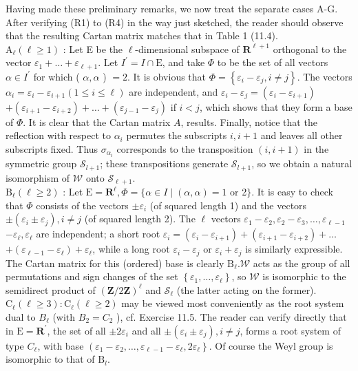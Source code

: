 \documentclass[10pt]{article}
\begin{document}
Having made these preliminary remarks, we now treat the separate cases A-G. After verifying (R1) to (R4) in the way just sketched, the reader should observe that the resulting Cartan matrix matches that in Table 1 (11.4).\\
$\mathrm{A}_{\ell}(\ell \geq 1)$ : Let E be the $\ell$-dimensional subspace of $\mathbf{R}^{\ell+1}$ orthogonal to the vector $\varepsilon_{1}+\ldots+\varepsilon_{\ell+1}$. Let $I^{\prime}=I \cap \mathrm{E}$, and take $\Phi$ to be the set of all vectors $\alpha \in I^{\prime}$ for which ( $\alpha, \alpha$ ) $=2$. It is obvious that $\Phi=\left\{\varepsilon_{i}-\varepsilon_{j}, i \neq j\right\}$. The vectors $\alpha_{i}=\varepsilon_{i}-\varepsilon_{i+1}(1 \leq i \leq \ell)$ are independent, and $\varepsilon_{i}-\varepsilon_{j}=\left(\varepsilon_{i}-\varepsilon_{i+1}\right)$ $+\left(\varepsilon_{i+1}-\varepsilon_{i+2}\right)+\ldots+\left(\varepsilon_{j-1}-\varepsilon_{j}\right)$ if $i<j$, which shows that they form a base of $\Phi$. It is clear that the Cartan matrix $A$, results. Finally, notice that the reflection with respect to $\alpha_{i}$ permutes the subscripts $i, i+1$ and leaves all other subscripts fixed. Thus $\sigma_{\alpha_{i}}$ corresponds to the transposition $(i, i+1)$ in the symmetric group $\mathscr{S}_{l+1}$; these transpositions generate $\mathscr{S}_{l+1}$, so we obtain a natural isomorphism of $\mathscr{W}$ onto $\mathscr{S}_{\ell+1}$.\\
$\mathrm{B}_{\ell}(\ell \geq 2)$ : Let $\mathrm{E}=\mathbf{R}^{\ell}, \Phi=\{\alpha \in I \mid(\alpha, \alpha)=1$ or 2$\}$. It is easy to check that $\Phi$ consists of the vectors $\pm \varepsilon_{i}$ (of squared length 1) and the vectors $\pm\left(\varepsilon_{i} \pm \varepsilon_{j}\right), i \neq j$ (of squared length 2). The $\ell$ vectors $\varepsilon_{1}-\varepsilon_{2}, \varepsilon_{2}-\varepsilon_{3}, \ldots, \varepsilon_{\ell-1}$ $-\varepsilon_{\ell}, \varepsilon_{\ell}$ are independent; a short root $\varepsilon_{i}=\left(\varepsilon_{i}-\varepsilon_{i+1}\right)+\left(\varepsilon_{i+1}-\varepsilon_{i+2}\right)+\ldots$ $+\left(\varepsilon_{\ell-1}-\varepsilon_{\ell}\right)+\varepsilon_{\ell}$, while a long root $\varepsilon_{i}-\varepsilon_{j}$ or $\varepsilon_{i}+\varepsilon_{j}$ is similarly expressible. The Cartan matrix for this (ordered) base is clearly $\mathrm{B}_{\ell} . \mathscr{W}$ acts as the group of all permutations and sign changes of the set $\left\{\varepsilon_{1}, \ldots, \varepsilon_{\ell}\right\}$, so $\mathscr{W}$ is isomorphic to the semidirect product of $(\mathbf{Z} / 2 \mathbf{Z})^{\ell}$ and $\mathscr{S}_{\ell}$ (the latter acting on the former).\\
$\mathrm{C}_{\ell}(\ell \geq 3): \mathrm{C}_{\ell}(\ell \geq 2)$ may be viewed most conveniently as the root system dual to $B_{\ell}$ (with $B_{2}=C_{2}$ ), cf. Exercise 11.5. The reader can verify directly that in $\mathrm{E}=\mathbf{R}^{\prime}$, the set of all $\pm 2 \varepsilon_{i}$ and all $\pm\left(\varepsilon_{i} \pm \varepsilon_{j}\right), i \neq j$, forms a root system of type $C_{\ell}$, with base $\left(\varepsilon_{1}-\varepsilon_{2}, \ldots, \varepsilon_{\ell-1}-\varepsilon_{\ell}, 2 \varepsilon_{\ell}\right\}$. Of course the Weyl group is isomorphic to that of $\mathrm{B}_{l}$.
\end{document}
